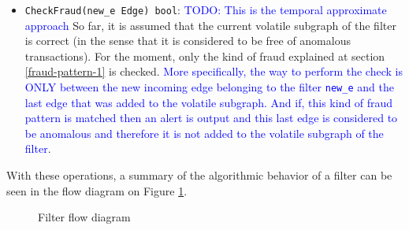 \begin{itemize}
    \item \texttt{CheckFraud(new\_e Edge) bool}: \textcolor{blue}{TODO: This is the temporal approximate approach} So far, it is assumed that the current volatile subgraph of the filter is correct (in the sense that it is considered to be free of anomalous transactions). For the moment, only the kind of fraud explained at section \ref{fraud-pattern-1} is checked. \textcolor{blue}{More specifically, the way to perform the check is ONLY between the new incoming edge belonging to the filter \texttt{new\_e} and the last edge that was added to the volatile subgraph. And if, this kind of fraud pattern is matched then an alert is output and this last edge is considered to be anomalous and therefore it is not added to the volatile subgraph of the filter}. 
    
\end{itemize}

With these operations, a summary of the algorithmic behavior of a filter can be seen in the flow diagram on Figure \ref{diag:filter-flow}.

\begin{figure}[H]
    \centering
    
    \caption{Filter flow diagram}
    \label{diag:filter-flow}
\end{figure}

